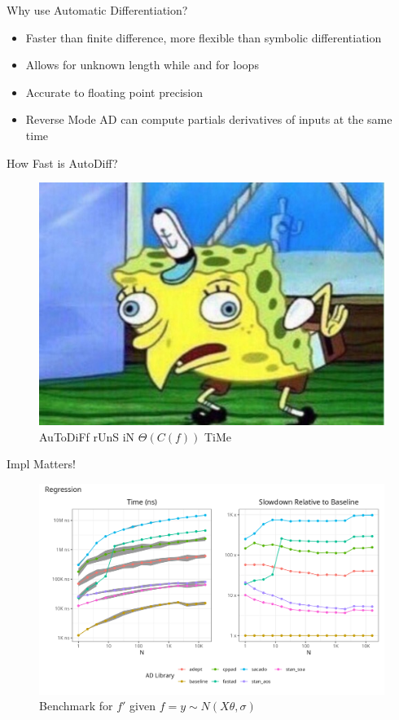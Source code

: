 \documentclass[dvipsnames]{beamer}
\begin{document}
\begin{frame}{Why use Automatic Differentiation?}
\begin{itemize}
\item Faster than finite difference, more flexible than symbolic differentiation
\item Allows for unknown length while and for loops
\item Accurate to floating point precision
\item Reverse Mode AD can compute partials derivatives of inputs at the same time 
\end{itemize}
\end{frame}

\begin{frame}{How Fast is AutoDiff?}
\begin{figure}
\centerline{\includegraphics[scale=.5]{img/mocking-spongebob.jpg}}
\caption{AuToDiFf rUnS iN $\Theta(C(f))$ TiMe}
\label{fig-spongebob}
\end{figure}
\end{frame}

\begin{frame}{Impl Matters!}
\begin{figure}
\centerline{\includegraphics[scale=.5]{img/combined_regression_plot.png}}
\caption{Benchmark for $f'$ given $f = y\sim N(X\theta,\sigma)$}
\label{fig-red-bench}
\end{figure}
\end{frame}
\end{document}
